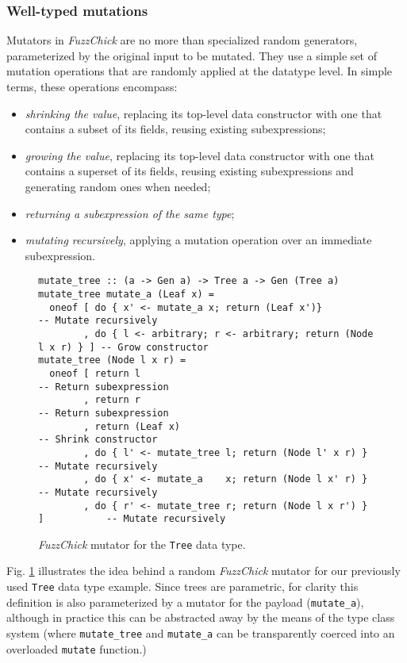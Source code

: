 \documentclass[acmsmall, anonymous]{acmart}
\newcommand{\fuzzchick}{\textit{FuzzChick}\xspace}
\begin{document}
\subsubsection{Well-typed mutations}

Mutators in \fuzzchick are no more than specialized random generators,
parameterized by the original input to be mutated.
%
They use a simple set of mutation operations that are randomly applied at the
datatype level.
%
In simple terms, these operations encompass:
%
\begin{itemize}
\item \emph{shrinking the value}, replacing its top-level data constructor with
  one that contains a subset of its fields, reusing existing subexpressions;
\item \emph{growing the value}, replacing its top-level data constructor with
  one that contains a superset of its fields, reusing existing subexpressions
  and generating random ones when needed;
\item \emph{returning a subexpression of the same type};
\item \emph{mutating recursively}, applying a mutation operation over an
  immediate subexpression.
\end{itemize}


\begin{figure}
\begin{verbatim}
mutate_tree :: (a -> Gen a) -> Tree a -> Gen (Tree a)
mutate_tree mutate_a (Leaf x) =
  oneof [ do { x' <- mutate_a x; return (Leaf x')}                     -- Mutate recursively
        , do { l <- arbitrary; r <- arbitrary; return (Node l x r) } ] -- Grow constructor
mutate_tree (Node l x r) =
  oneof [ return l                                                     -- Return subexpression
        , return r                                                     -- Return subexpression
        , return (Leaf x)                                              -- Shrink constructor
        , do { l' <- mutate_tree l; return (Node l' x r) }             -- Mutate recursively
        , do { x' <- mutate_a    x; return (Node l x' r) }             -- Mutate recursively
        , do { r' <- mutate_tree r; return (Node l x r') } ]           -- Mutate recursively
\end{verbatim}
\caption{\label{fig:fuzzchick:mutator}\fuzzchick mutator for the \texttt{Tree} data type. }
\end{figure}

Fig. \ref{fig:fuzzchick:mutator} illustrates the idea behind a random \fuzzchick
mutator for our previously used \texttt{Tree} data type example.
%
Since trees are parametric, for clarity this definition is also parameterized by
a mutator for the payload (\texttt{mutate\_a}), although in practice this can be
abstracted away by the means of the type class system (where
\texttt{mutate\_tree} and \texttt{mutate\_a} can be transparently coerced into
an overloaded \texttt{mutate} function.)
\end{document}
